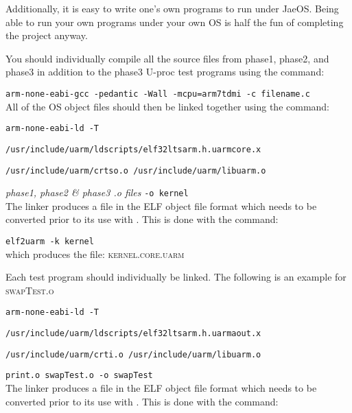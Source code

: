 Additionally, it is easy to write one's own programs to run under JaeOS. 
Being able to run your own programs under your own OS is half the fun of completing the project anyway.

You should individually compile all the source files from phase1, phase2, and phase3 in addition to the phase3 U-proc test programs using the command:

\vspace{0.1cm}
\verb+arm-none-eabi-gcc -pedantic -Wall -mcpu=arm7tdmi -c filename.c+
\vspace{0.1cm}\\
All of the OS object files should then be linked together using the command:

\vspace{0.1cm}
\verb+arm-none-eabi-ld -T+

\hspace{0.5cm} \verb+/usr/include/uarm/ldscripts/elf32ltsarm.h.uarmcore.x+

\hspace{0.5cm} \verb+/usr/include/uarm/crtso.o /usr/include/uarm/libuarm.o+

\hspace{0.5cm} \emph{phase1, phase2 \& phase3 .o files} \verb+-o kernel+
\vspace{0.1cm}\\
The linker produces a file in the ELF object file format which needs to be converted prior to its use with \uarm{}. This is done with the command:

\vspace{0.1cm}
\verb+elf2uarm -k kernel+
\vspace{0.1cm}\\
which produces the file: \textsc{kernel.core.uarm}

Each test program should individually be linked. 
The following is an example for \textsc{swapTest.o}

\vspace{0.1cm}
\verb+arm-none-eabi-ld -T+

\hspace{0.5cm} \verb+/usr/include/uarm/ldscripts/elf32ltsarm.h.uarmaout.x+

\hspace{0.5cm} \verb+/usr/include/uarm/crti.o /usr/include/uarm/libuarm.o+

\hspace{0.5cm} \verb+print.o swapTest.o -o swapTest+
\vspace{0.1cm}\\
The linker produces a file in the ELF object file format which needs to be converted prior to its use with \uarm{}.
This is done with the command:

